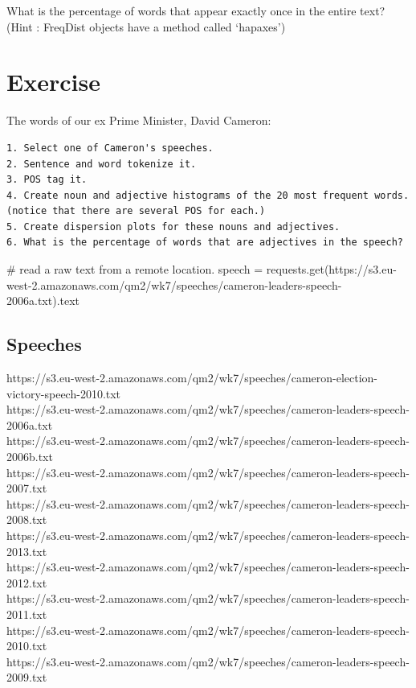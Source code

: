 \documentclass[
  letterpaper,
  DIV=11,
  numbers=noendperiod]{scrreprt}
\newenvironment{Shaded}{\begin{snugshade}}{\end{snugshade}}
\newcommand{\CommentTok}[1]{\textcolor[rgb]{0.37,0.37,0.37}{#1}}
\newcommand{\NormalTok}[1]{\textcolor[rgb]{0.00,0.23,0.31}{#1}}
\newcommand{\OperatorTok}[1]{\textcolor[rgb]{0.37,0.37,0.37}{#1}}
\newcommand{\StringTok}[1]{\textcolor[rgb]{0.13,0.47,0.30}{#1}}
\begin{document}
What is the percentage of words that appear exactly once in the entire
text? (Hint : FreqDist objects have a method called `hapaxes')

\hypertarget{exercise-12}{%
\section{Exercise}\label{exercise-12}}

The words of our ex Prime Minister, David Cameron:

\begin{verbatim}
1. Select one of Cameron's speeches.
2. Sentence and word tokenize it.
3. POS tag it.
4. Create noun and adjective histograms of the 20 most frequent words.
(notice that there are several POS for each.)
5. Create dispersion plots for these nouns and adjectives. 
6. What is the percentage of words that are adjectives in the speech?
\end{verbatim}

\begin{Shaded}
\begin{Highlighting}[]
\CommentTok{\# read a raw text from a remote location. }
\NormalTok{speech }\OperatorTok{=}\NormalTok{ requests.get(}\StringTok{\textquotesingle{}https://s3.eu{-}west{-}2.amazonaws.com/qm2/wk7/speeches/cameron{-}leaders{-}speech{-}2006a.txt\textquotesingle{}}\NormalTok{).text}
\end{Highlighting}
\end{Shaded}

\hypertarget{speeches}{%
\subsection{Speeches}\label{speeches}}

https://s3.eu-west-2.amazonaws.com/qm2/wk7/speeches/cameron-election-victory-speech-2010.txt\\
https://s3.eu-west-2.amazonaws.com/qm2/wk7/speeches/cameron-leaders-speech-2006a.txt\\
https://s3.eu-west-2.amazonaws.com/qm2/wk7/speeches/cameron-leaders-speech-2006b.txt\\
https://s3.eu-west-2.amazonaws.com/qm2/wk7/speeches/cameron-leaders-speech-2007.txt\\
https://s3.eu-west-2.amazonaws.com/qm2/wk7/speeches/cameron-leaders-speech-2008.txt\\
https://s3.eu-west-2.amazonaws.com/qm2/wk7/speeches/cameron-leaders-speech-2013.txt\\
https://s3.eu-west-2.amazonaws.com/qm2/wk7/speeches/cameron-leaders-speech-2012.txt\\
https://s3.eu-west-2.amazonaws.com/qm2/wk7/speeches/cameron-leaders-speech-2011.txt\\
https://s3.eu-west-2.amazonaws.com/qm2/wk7/speeches/cameron-leaders-speech-2010.txt\\
https://s3.eu-west-2.amazonaws.com/qm2/wk7/speeches/cameron-leaders-speech-2009.txt
\end{document}
